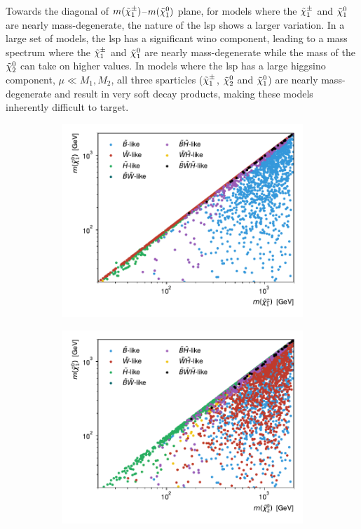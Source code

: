 Towards the diagonal of $m(\tilde{\chi}_1^\pm)$--$m(\tilde{\chi}_1^0)$ plane, \ie for models where the $\tilde{\chi}_1^\pm$ and $\tilde{\chi}_1^0$ are nearly mass-degenerate, the nature of the \gls{lsp} shows a larger variation. In a large set of models, the \gls{lsp} has a significant wino component, leading to a mass spectrum where the $\tilde{\chi}_1^\pm$ and $\tilde{\chi}_1^0$ are nearly mass-degenerate while the mass of the $\tilde{\chi}_2^0$ can take on higher values. In models where the \gls{lsp} has a large higgsino component, \ie $\mu \ll M_1, M_2$, all three sparticles ($\tilde{\chi}_1^\pm$, $\tilde{\chi}_2^0$ and $\tilde{\chi}_1^0$) are nearly mass-degenerate and result in very soft decay products, making these models inherently difficult to target.

 \begin{figure}
	\centering
	\begin{subfigure}[b]{0.5\linewidth}
		\centering\includegraphics[width=\textwidth]{scatter/lsp_types.pdf}
		\caption{\label{fig:lsp_types}}
	\end{subfigure}\hfill
	\begin{subfigure}[b]{0.5\linewidth}
		\centering\includegraphics[width=\textwidth]{scatter/lsp_types_N2.pdf}

\end{subfigure}
\end{figure}
